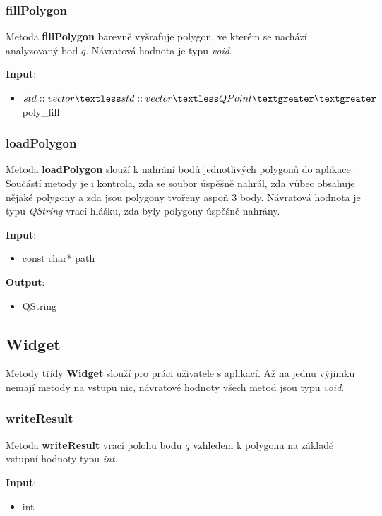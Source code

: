 \documentclass[a4paper, 12pt]{article}
\begin{document}
\subsubsection{fillPolygon}
Metoda \textbf{fillPolygon} barevně vyšrafuje polygon, ve kterém se nachází analyzovaný bod $q$. Návratová hodnota je typu \textsl{void}.

\textbf{Input}:
\begin{itemize}
\item $std::vector\textless std::vector\textless QPoint\textgreater \textgreater$ poly\_fill
\end{itemize}

\subsubsection{loadPolygon}
Metoda \textbf{loadPolygon} slouží k nahrání bodů jednotlivých polygonů do aplikace.  Součástí metody je i kontrola, zda se soubor úspěšně nahrál, zda vůbec obsahuje nějaké polygony a zda jsou polygony tvořeny aspoň 3 body. Návratová hodnota je typu \textsl{QString} vrací hlášku, zda byly polygony úspěšně nahrány.

\textbf{Input}:
\begin{itemize}
\item const char* path
\end{itemize}

\textbf{Output}:
\begin{itemize}
\item QString
\end{itemize}

\subsection{Widget}
Metody třídy \textbf{Widget} slouží pro práci uživatele s aplikací. Až na jednu výjimku nemají metody na vstupu nic, návratové hodnoty všech metod jsou typu \textsl{void}.

\subsubsection{writeResult}
Metoda \textbf{writeResult} vrací polohu bodu $q$ vzhledem k polygonu na základě vstupní hodnoty typu \textit{int}.

\textbf{Input}:
\begin{itemize}
\item int
\end{itemize}
\end{document}
